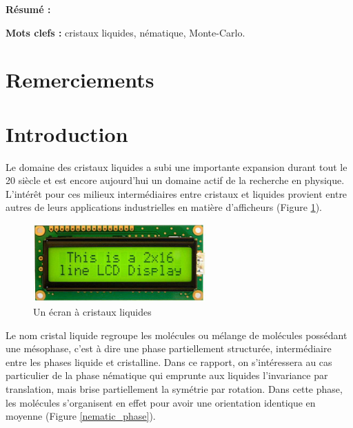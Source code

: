 \documentclass[11pt,a4paper]{article}
\numberwithin{equation}{section}
\begin{document}
\begin{titlepage}
\textbf{Résumé :} 
\vspace{0.3cm}

\textbf{Mots clefs :} cristaux liquides, nématique, Monte-Carlo.
\vspace{0.3cm}


\end{titlepage}

\newpage

\renewcommand\thepage{}

\section*{Remerciements}




\tableofcontents


\newpage
\renewcommand\thepage{\arabic{page}}
\setcounter{page}{1}



\section*{Introduction}
Le domaine des cristaux liquides a subi une importante expansion durant tout le 20 siècle et est encore aujourd'hui un domaine actif de la recherche en physique. 
L'intérêt pour ces milieux intermédiaires entre cristaux et liquides provient entre autres de leurs applications industrielles en matière d'afficheurs (Figure \ref{lcd}).

\begin{figure}[h]
    \centering	    
	\includegraphics[height=3cm]{figures/lcd.jpg}
    \caption{Un écran à cristaux liquides}
    	\label{lcd} 
\end{figure}

Le nom cristal liquide regroupe les molécules ou mélange de molécules possédant une mésophase, c'est à dire une phase partiellement structurée, intermédiaire entre les phases liquide et cristalline.
Dans ce rapport, on s'intéressera au cas particulier de la phase nématique qui emprunte aux liquides l'invariance par translation, mais brise partiellement la symétrie par rotation.
Dans cette phase, les molécules s'organisent en effet pour avoir une orientation identique en moyenne (Figure \ref{nematic_phase}).
\end{document}

